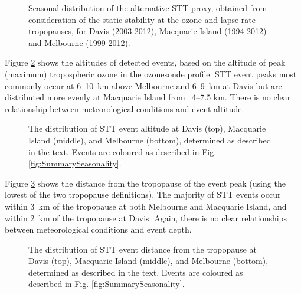   \begin{figure}[t]
    
    \caption{Seasonal distribution of the alternative STT proxy, obtained from consideration of the static stability at the ozone and lapse rate tropopauses, for Davis (2003-2012), Macquarie Island (1994-2012) and Melbourne (1999-2012).}
    \label{fig:AndrewProxySTT}
    
  \end{figure}
  
  Figure \ref{fig:SummaryAltitudes} shows the altitudes of detected events, based on the altitude of peak (maximum) tropospheric ozone in the ozonesonde profile.
  STT event peaks most commonly occur at 6--10~km above Melbourne and 6--9~km at Davis but are distributed more evenly at Macquarie Island from ~4--7.5 km.
  There is no clear relationship between meteorological conditions and event altitude.
  
  \begin{figure}[t]
    
    \caption{The distribution of STT event altitude at Davis (top), Macquarie Island (middle), and Melbourne (bottom), determined as described in the text.
    Events are coloured as described in Fig. \ref{fig:SummarySeasonality}.}
    \label{fig:SummaryAltitudes}
    
  \end{figure}

  Figure \ref{fig:SummaryTPDepths} shows the distance from the tropopause of the event peak (using the lowest of the two tropopause definitions).
  The majority of STT events occur within 3~km of the tropopause at both Melbourne and Macquarie Island, and within 2~km of the tropopause at Davis. 
  Again, there is no clear relationships between meteorological conditions and event depth.

  \begin{figure}[t]
    
    \caption{The distribution of STT event distance from the tropopause at Davis (top), Macquarie Island (middle), and Melbourne (bottom), determined as described in the text.
    Events are coloured as described in Fig. \ref{fig:SummarySeasonality}.}
    \label{fig:SummaryTPDepths}
    
  \end{figure}

